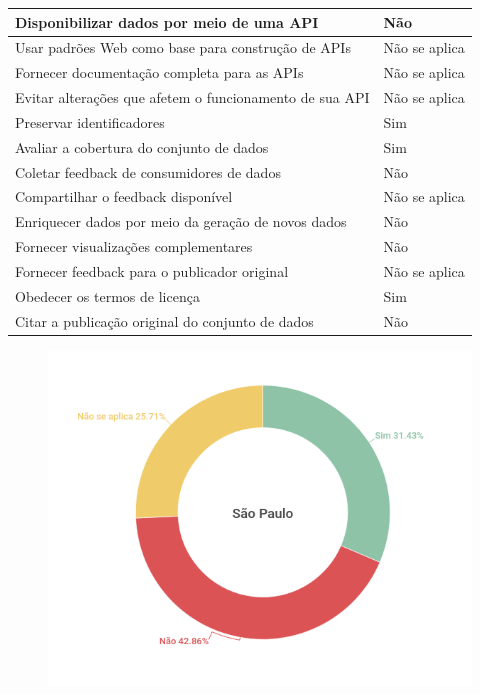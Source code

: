 \begin{center}
\begin{tabularx}{1\textwidth} { 
  | >{\centering\arraybackslash}X 
  | >{\centering\arraybackslash}X | }
  \hline
Disponibilizar dados por meio de uma API & Não \\
\hline
Usar padrões Web como base para construção de APIs & Não se aplica \\
\hline
Fornecer documentação completa para as APIs & Não se aplica \\
\hline
Evitar alterações que afetem o funcionamento de sua API & Não se aplica \\
\hline
Preservar identificadores & Sim \\
\hline
Avaliar a cobertura do conjunto de dados & Sim \\
\hline
Coletar feedback de consumidores de dados & Não \\
\hline
Compartilhar o feedback disponível & Não se aplica \\
\hline
Enriquecer dados por meio da geração de novos dados & Não \\
\hline
Fornecer visualizações complementares & Não \\
\hline
Fornecer feedback para o publicador original & Não se aplica \\
\hline
Obedecer os termos de licença & Sim \\
\hline
Citar a publicação original do conjunto de dados & Não \\
\hline
  \end{tabularx}
\end{center}

\begin{figure}[H]
    \centering
    \includegraphics[scale=0.5]{images/grafico1.png}
    \label{fig:2}
\end{figure}

